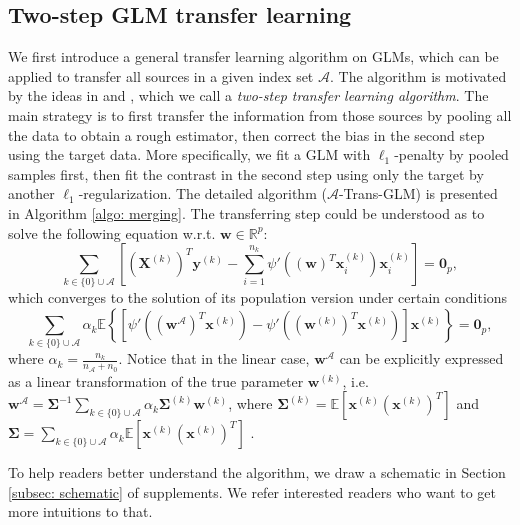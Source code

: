 \documentclass[12pt]{article}
\newcommand{\te}{\mathbb{E}}
\newcommand{\bxk}[1]{\bm{x}^{(#1)}}
\newcommand{\byk}[1]{\bm{y}^{(#1)}}
\newcommand{\bXk}[1]{\bm{X}^{(#1)}}
\newcommand{\bw}{\bm{w}}
\newcommand{\bwk}[1]{\bm{w}^{(#1)}}
\newcommand{\bwa}{\bm{w}^{\mathcal{A}}}
\newcommand{\ma}{\mathcal{A}}
\newcommand{\na}{n_{\mathcal{A}}}
\newcommand{\<}{\langle}
\renewcommand{\>}{\rangle}
\begin{document}
\subsection{Two-step GLM transfer learning}\label{subsec:glm tranfer alg}
We first introduce a general transfer learning algorithm on GLMs, which can be applied to transfer all sources in a given index set $\ma$. The algorithm is motivated by the ideas in \cite{bastani2021predicting} and \cite{li2021transfer}, which we call a \textit{two-step transfer learning algorithm}. The main strategy is to first transfer the information from those sources by pooling all the data to obtain a rough estimator, then correct the bias in the second step using the target data. More specifically, we fit a GLM with $\ell_1$-penalty by pooled samples first, then fit the contrast in the second step using only the target by another $\ell_1$-regularization. The detailed algorithm ($\ma$-Trans-GLM) is presented in Algorithm \ref{algo: merging}.  The transferring step could be understood as to solve the following equation w.r.t. $\bw \in \mathbb{R}^p$:
\begin{equation}\label{eq: sample version equation wa}
	\sum\limits_{k\in\{0\}\cup \ma}\left[(\bXk{k})^T\byk{k} - \sum\limits_{i=1}^{n_k}\psi'((\bw)^T\bxk{k}_i)\bxk{k}_i\right] = \bm{0}_{p},
\end{equation}
which converges to the solution of its population version under certain conditions
\begin{equation}\label{eq: wa in population merging}
	\sum\limits_{k\in\{0\}\cup \ma}\alpha_k\te\left\{[\psi'((\bwa)^T\bxk{k})-\psi'((\bwk{k})^T\bxk{k})]\bxk{k}\right\} = \bm{0}_{p},
\end{equation}
where $\alpha_k = \frac{n_k}{\na + n_0}$. Notice that in the linear case, $\bwa$ can be explicitly expressed as a linear transformation of the true parameter $\bwk{k}$, i.e. $
	\bwa = \bm{\Sigma}^{-1}\sum_{k \in \{0\}\cup \ma} \alpha_k \bm{\Sigma}^{(k)}\bwk{k}$,
where $\bm{\Sigma}^{(k)} = \te[\bxk{k}(\bxk{k})^T]$ and $\bm{\Sigma} = \sum_{k \in \{0\}\cup \ma}\alpha_k\te[\bxk{k}(\bxk{k})^T]$ \citep{li2021transfer}. 

To help readers better understand the algorithm, we draw a schematic in Section \ref{subsec: schematic} of supplements. We refer interested readers who want to get more intuitions to that.
\end{document}
